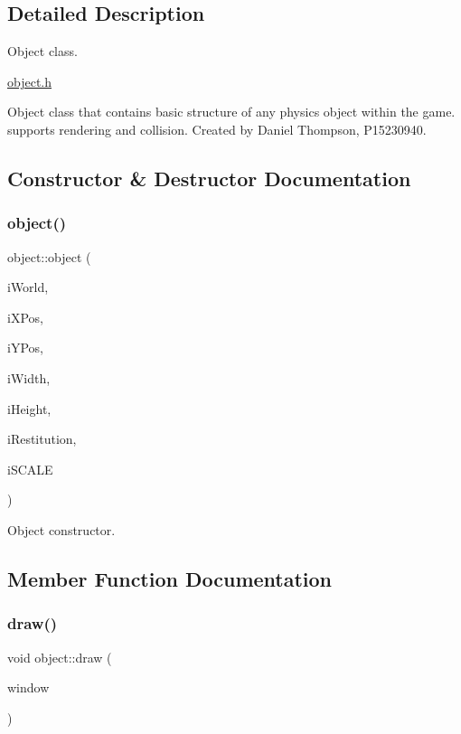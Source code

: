\subsection{Detailed Description}
Object class. 

\hyperlink{object_8h}{object.\+h}

Object class that contains basic structure of any physics object within the game. supports rendering and collision. Created by Daniel Thompson, P15230940. 

\subsection{Constructor \& Destructor Documentation}
\mbox{\label{classobject_a6444f1addfcba46e8a38e3a10afc5b55}} 
\subsubsection{\texorpdfstring{object()}{object()}}
{\footnotesize\ttfamily object\+::object (\begin{DoxyParamCaption}\item[{b2\+World \&}]{i\+World,  }\item[{float}]{i\+X\+Pos,  }\item[{float}]{i\+Y\+Pos,  }\item[{float}]{i\+Width,  }\item[{float}]{i\+Height,  }\item[{int}]{i\+Restitution,  }\item[{double}]{i\+S\+C\+A\+LE }\end{DoxyParamCaption})}



Object constructor. 



\subsection{Member Function Documentation}
\mbox{\label{classobject_a844b4128957b29e24370efe2d2cb3dca}} 
\subsubsection{\texorpdfstring{draw()}{draw()}}
{\footnotesize\ttfamily void object\+::draw (\begin{DoxyParamCaption}\item[{sf\+::\+Render\+Window \&}]{window }\end{DoxyParamCaption})}



